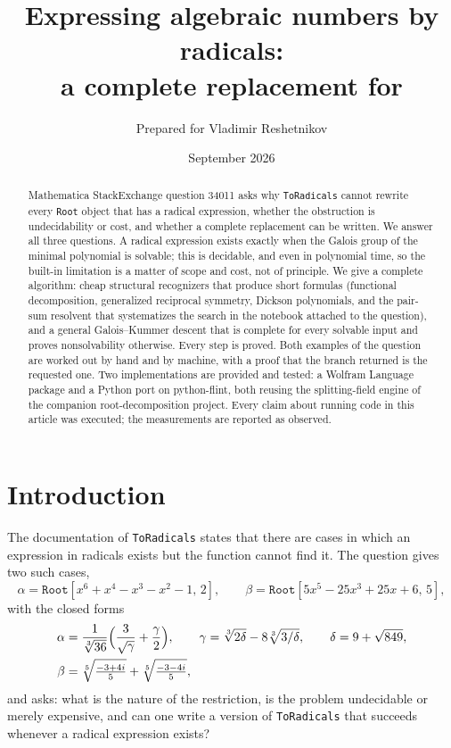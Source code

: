 \documentclass[11pt,a4paper]{article}
\title{Expressing algebraic numbers by radicals:\\ a complete replacement for \ToRadicals}
\author{Prepared for Vladimir Reshetnikov}
\date{September 2026}
\theoremstyle{definition}
\theoremstyle{remark}
\newcommand{\code}[1]{\texttt{#1}}
\newcommand{\Root}{\code{Root}}
\newcommand{\ToRadicals}{\code{ToRadicals}}
\begin{document}
\maketitle

\begin{abstract}
\noindent
Mathematica StackExchange question 34011 asks why \ToRadicals{} cannot rewrite every
\Root{} object that has a radical expression, whether the obstruction is undecidability
or cost, and whether a complete replacement can be written.  We answer all three
questions.  A radical expression exists exactly when the Galois group of the minimal
polynomial is solvable; this is decidable, and even in polynomial time, so the built-in
limitation is a matter of scope and cost, not of principle.  We give a complete
algorithm: cheap structural recognizers that produce short formulas (functional
decomposition, generalized reciprocal symmetry, Dickson polynomials, and the pair-sum
resolvent that systematizes the search in the notebook attached to the question),
and a general Galois--Kummer descent that is complete for every solvable input and
proves nonsolvability otherwise.  Every step is proved.  Both examples of the question
are worked out by hand and by machine, with a proof that the branch returned is the
requested one.  Two implementations are provided and tested: a Wolfram Language package
and a Python port on python-flint, both reusing the splitting-field engine of the
companion root-decomposition project.  Every claim about running code in this article
was executed; the measurements are reported as observed.
\end{abstract}

\tableofcontents

\section{Introduction}\label{sec:intro}

The documentation of \ToRadicals{} states that there are cases in which an expression in
radicals exists but the function cannot find it.  The question gives two such cases,
\begin{equation}\label{eq:examples}
\alpha = \Root[x^6+x^4-x^3-x^2-1,\,2], \qquad
\beta  = \Root[5x^5-25x^3+25x+6,\,5],
\end{equation}
with the closed forms
\begin{equation}\label{eq:closedforms}
\begin{aligned}
\alpha&=\frac{1}{\sqrt[3]{36}}\Bigl(\frac{3}{\sqrt{\gamma}}+\frac{\gamma}{2}\Bigr),\qquad
\gamma=\sqrt[3]{2\delta}-8\sqrt[3]{3/\delta},\qquad \delta=9+\sqrt{849},\\
\beta&=\sqrt[5]{\tfrac{-3+4i}{5}}+\sqrt[5]{\tfrac{-3-4i}{5}},
\end{aligned}
\end{equation}
and asks: what is the nature of the restriction, is the problem undecidable or merely
expensive, and can one write a version of \ToRadicals{} that succeeds whenever a radical
expression exists?
\end{document}
